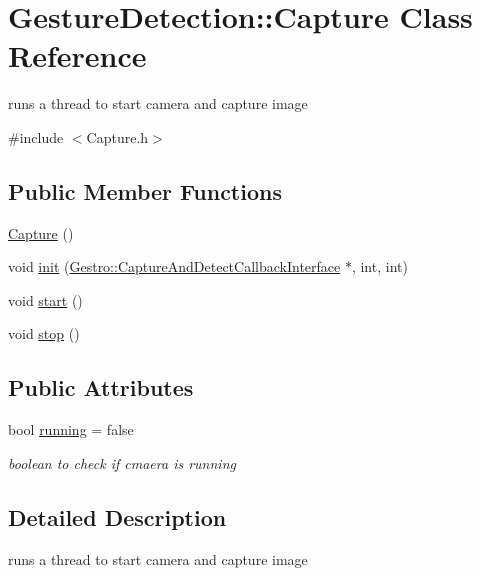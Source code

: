 \hypertarget{classGestureDetection_1_1Capture}{}\section{Gesture\+Detection\+:\+:Capture Class Reference}
\label{classGestureDetection_1_1Capture}


runs a thread to start camera and capture image  




{\ttfamily \#include $<$Capture.\+h$>$}

\subsection*{Public Member Functions}
\begin{DoxyCompactItemize}
\item 
\hyperlink{classGestureDetection_1_1Capture_a97036b5d271238bd4852da79a0091b57}{Capture} ()
\item 
void \hyperlink{classGestureDetection_1_1Capture_aaff420636b6bac6593789344cc990580}{init} (\hyperlink{classGestro_1_1CaptureAndDetectCallbackInterface}{Gestro\+::\+Capture\+And\+Detect\+Callback\+Interface} $\ast$, int, int)
\item 
void \hyperlink{classGestureDetection_1_1Capture_a2ffe4eeac4caa296f4fcc75cc82c1436}{start} ()
\item 
void \hyperlink{classGestureDetection_1_1Capture_ab632f1927461a909b18cce71ec96f76d}{stop} ()
\end{DoxyCompactItemize}
\subsection*{Public Attributes}
\begin{DoxyCompactItemize}
\item 
bool \hyperlink{classGestureDetection_1_1Capture_ab022086194534e994259e0f6de25e350}{running} = false
\begin{DoxyCompactList}\small\item\em boolean to check if cmaera is running \end{DoxyCompactList}\end{DoxyCompactItemize}


\subsection{Detailed Description}
runs a thread to start camera and capture image 

